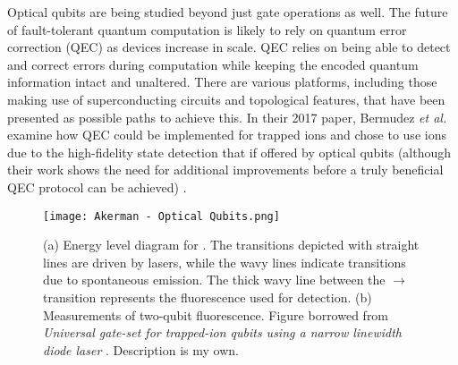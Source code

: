 Optical qubits are being studied beyond just gate operations as well. The future of fault-tolerant quantum computation is likely to rely on quantum error correction (QEC) as devices increase in scale. QEC relies on being able to detect and correct errors during computation while keeping the encoded quantum information intact and unaltered. There are various platforms, including those making use of superconducting circuits and topological features, that have been presented as possible paths to achieve this. In their 2017 paper, Bermudez \textit{et al.} examine how QEC could be implemented for trapped ions and chose to use  ions due to the high-fidelity state detection that if offered by optical qubits (although their work shows the need for additional improvements before a truly beneficial QEC protocol can be achieved) \cite{Bermudez}.

\begin{figure}[h]
    \texttt{[image: Akerman - Optical Qubits.png]}
    \caption{(a) Energy level diagram for . The transitions depicted with straight lines are driven by lasers, while the wavy lines indicate transitions due to spontaneous emission. The thick wavy line between the  $\rightarrow$  transition represents the fluorescence used for detection. (b) Measurements of two-qubit fluorescence. Figure borrowed from \textit{Universal gate-set for trapped-ion qubits using a narrow linewidth diode laser} \cite{Akerman}. Description is my own.}
    \label{fig:Optical}
\end{figure}